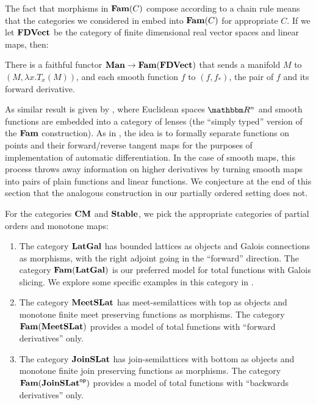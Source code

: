The fact that morphisms in $\mathbf{Fam}(C)$ compose according to a chain rule
means that the categories we considered in 
embed into $\mathbf{Fam}(C)$ for appropriate $C$. If we let $\mathbf{FDVect}$ be the
category of finite dimensional real vector spaces and linear maps,
then:

\begin{proposition}
  \label{prop:embed-manifolds}
  There is a faithful functor $\mathbf{Man} \to \mathbf{Fam}(\mathbf{FDVect})$ that sends a
  manifold $M$ to $(M, \lambda x. T_x(M))$, and each smooth function
  $f$ to $(f, f_*)$, the pair of $f$ and its forward derivative.
\end{proposition}

As similar result is given by \citet{cruttwell2022}, where Euclidean
spaces $\RR^n$ and smooth functions are embedded into a category of
lenses (the ``simply typed'' version of the $\mathbf{Fam}$ construction). As
in \citet{vakar22}, the idea is to formally separate functions on
points and their forward/reverse tangent maps for the purposes of
implementation of automatic differentiation. In the case of smooth
maps, this process throws away information on higher derivatives by
turning smooth maps into pairs of plain functions and linear
functions. We conjecture at the end of this section that the analogous
construction in our partially ordered setting does not.

For the categories $\mathbf{CM}$ and $\mathbf{Stable}$, we pick the appropriate
categories of partial orders and monotone maps:

\begin{enumerate}
\item The category $\mathbf{LatGal}$ has bounded lattices as objects and
  Galois connections as morphisms, with the right adjoint going in the
  ``forward'' direction. The category $\mathbf{Fam}(\mathbf{LatGal})$ is our preferred
  model for total functions with Galois slicing. We explore some
  specific examples in this category in .
\item The category $\mathbf{MeetSLat}$ has meet-semilattices with top as
  objects and monotone finite meet preserving functions as
  morphisms. The category $\mathbf{Fam}(\mathbf{MeetSLat})$ provides a model of
  total functions with ``forward derivatives'' only.
\item The category $\mathbf{JoinSLat}$ has join-semilattices with bottom as
  objects and monotone finite join preserving functions as
  morphisms. The category $\mathbf{Fam}(\mathbf{JoinSLat}^{\mathsf{op}})$ provides a model of
  total functions with ``backwards derivatives'' only.
\end{enumerate}

